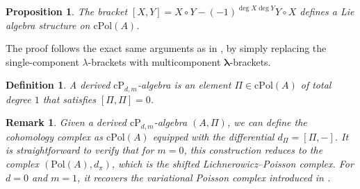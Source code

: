 \documentclass[11pt]{article}
\numberwithin{equation}{section}
\newtheorem{definition}{Definition}[section]
\newtheorem{prop}{Proposition}[section]
\newtheorem{remark}{Remark}[section]
\begin{document}
\begin{prop}
	The bracket $[X,Y] = X\circ Y - (-1)^{\deg X \deg Y} Y \circ X$
	defines a Lie algebra structure on $\mathrm{cPol}(A)$.
\end{prop}
The proof follows the exact same arguments as in \cite{de2013variational,bakalov2019operadic}, by simply replacing the single-component $\lambda$-brackets with multicomponent $\boldsymbol{\lambda}$-brackets.

\begin{definition}
	A derived $\mathrm{cP}_{d,m}$-algebra is an element $\Pi \in \mathrm{cPol}(A)$ of total degree $1$ that satisfies $[\Pi,\Pi] = 0$. 
\end{definition}

\begin{remark}
	Given a derived $\mathrm{cP}_{d,m}$-algebra $(A,\Pi)$, we can define the cohomology complex as $\mathrm{cPol}(A)$ equipped with the differential $d_{\Pi} = [\Pi,-]$.
	It is straightforward to verify that for $m=0$, this construction reduces to the complex $(\mathrm{Pol}(A), d_{\pi})$, which is the shifted Lichnerowicz--Poisson complex. For $d=0$ and $m=1$, it recovers the variational Poisson complex introduced in \cite{de2013variational}.
\end{remark}
\end{document}
